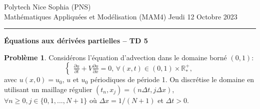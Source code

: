 \documentclass[12pt,a4paper]{article}
\begin{document}
 \hfill Polytech Nice Sophia (PNS)\\
\noindent Math\'ematiques Appliqu\'ees et Mod\'elisation (MAM4) \hfill Jeudi 12 Octobre 2023 \\

\hrule

\bigskip
\bigskip

\begin{center}{\bf \'Equations aux d\'eriv\'ees partielles --
TD 5}\end{center}

\bigskip

\parskip 12pt
{\bf Probl\`eme 1}. Consid\'erons l'\'equation d'advection dans le domaine born\'e $(0,1)$:
$$
\begin{cases}
\displaystyle\frac{\partial u}{\partial t}+V\frac{\partial u}{\partial
  x}=0,\, \forall (x,t)\in(0,1)\times\mathbb{R}^+_*,
\end{cases}
$$
avec $u(x, 0) = u_0$, $u$ et $u_0$ p\'eriodiques de p\'eriode 1.
On discr\'etise le domaine en utilisant un maillage r\'egulier
$(t_n,x_j)=(n\Delta t,j\Delta x)$,  $\forall n\ge 0,
j\in\{0,1,...,N+1\}$ o\`u $\Delta x=1/(N+1)$ et $\Delta t>0$.
\end{document}
